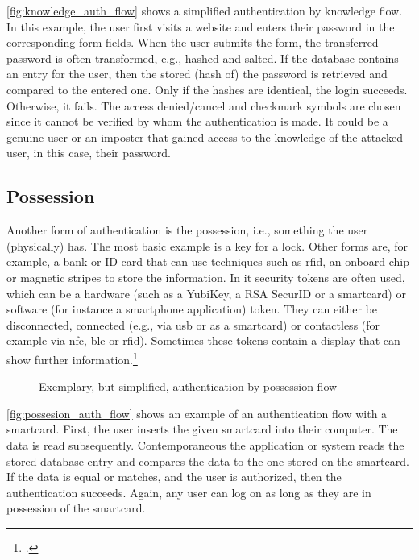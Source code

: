 \autoref{fig:knowledge_auth_flow} shows a simplified authentication by knowledge flow. In this example, the user first visits a website and enters their password in the corresponding form fields. When the user submits the form, the transferred password is often transformed, e.g., hashed and salted. If the database contains an entry for the user, then the stored (hash of) the password is retrieved and compared to the entered one. Only if the hashes are identical, the login succeeds. Otherwise, it fails. The \frqq access denied/cancel\flqq{} and \frqq checkmark\flqq{} symbols are chosen since it cannot be verified by whom the authentication is made. It could be a genuine user or an imposter that gained access to the knowledge of the attacked user, in this case, their password.

\subsection{Possession}

Another form of authentication is the possession, i.e., \frqq something the user (physically) has\flqq{}. The most basic example is a key for a lock. Other forms are, for example, a bank or ID card that can use techniques such as \gls{rfid}, an onboard chip or magnetic stripes to store the information. In \gls{it} security tokens are often used, which can be a hardware (such as a YubiKey, a RSA SecurID or a smartcard) or software (for instance a smartphone application) token. They can either be disconnected, connected (e.g., via \gls{usb} or as a smartcard) or contactless (for example via \gls{nfc}, \gls{ble} or \gls{rfid}). Sometimes these tokens contain a display that can show further information.\footcites[See][24]{265831}[See][]{Dressel:2019:SZT:3319499.3328225}[See][8--11]{1698485}

\begin{figure}[hbt]
	\centering
	
	\caption[Exemplary, but simplified, authentication by possession flow]{Exemplary, but simplified, authentication by possession flow\footnotemark}
	\label{fig:possesion_auth_flow}
\end{figure}

\autoref{fig:possesion_auth_flow} shows an example of an authentication flow with a smartcard. First, the user inserts the given smartcard into their computer. The data is read subsequently. Contemporaneous the application or system reads the stored database entry and compares the data to the one stored on the smartcard. If the data is equal or matches, and the user is authorized, then the authentication succeeds. Again, any user can log on as long as they are in possession of the smartcard.


